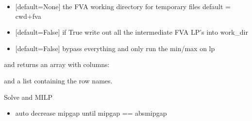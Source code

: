 \documentclass[letterpaper,10pt,english]{sphinxmanual}
\begin{document}
\begin{fulllineitems}
\begin{itemize}
\item {} 
\sphinxAtStartPar
{} {[}default=None{]} the FVA working directory for temporary files default = cwd+fva

\item {} 
\sphinxAtStartPar
{} {[}default=False{]} if True write out all the intermediate FVA LP’s into work\_dir

\item {} 
\sphinxAtStartPar
{} {[}default=False{]} bypass everything and only run the min/max on lp

\end{itemize}

\sphinxAtStartPar
and returns an array with columns:

\begin{sphinxVerbatim}[commandchars=\\\{\}]
         
\end{sphinxVerbatim}

\sphinxAtStartPar
and a list containing the row names.

\end{fulllineitems}


\begin{fulllineitems}
\label{\detokenize{modules_doc:cbmpy.CBCPLEX.cplx_SolveMILP}}
\pysigstartsignatures
{}
\pysigstopsignatures
\sphinxAtStartPar
Solve and MILP
\begin{itemize}
\item {} 
\sphinxAtStartPar
{} auto decrease mipgap until mipgap == absmipgap

\end{itemize}

\end{fulllineitems}

\end{document}
